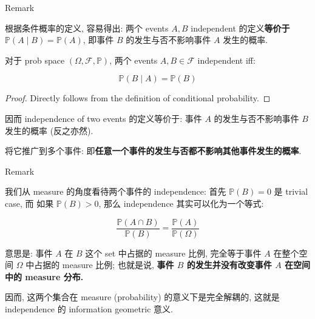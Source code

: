 \begin{qlremark}{Remark}

根据条件概率的定义, 容易得出: 两个 events \(\mathit{A},\mathit{B}\) independent 的定义\textbf{等价于 \(\mathbb{P}(\mathit{A} \mid \mathit{B}) = \mathbb{P}(\mathit{A})\)}, 即事件 \(\mathit{B}\) 的发生与否不影响事件 \(\mathit{A}\) 发生的概率.\\

\begin{proposition}{}

对于 prob space \((\Omega,\mathcal{F},\mathbb{P})\), 两个 events \(\mathit{A},\mathit{B} \in \mathcal{F}\) independent iff:

\[\mathbb{P}(\mathit{B} \mid \mathit{A}) = \mathbb{P}(\mathit{B})\]

\end{proposition}

\begin{proof}

Directly follows from the definition of conditional probability.

\end{proof}

因而 independence of two events 的定义等价于: 事件 \(\mathit{A}\) 的发生与否不影响事件 \(\mathit{B}\) 发生的概率 (反之亦然).

将它推广到多个事件: 即\textbf{任意一个事件的发生与否都不影响其他事件发生的概率}.

\end{qlremark}

\begin{qlremark}{Remark}

我们从 measure 的角度看待两个事件的 independence: 首先 \(\mathbb{P}(\mathit{B}) = 0\) 是 trivial case, 而 如果 \(\mathbb{P}(\mathit{B}) > 0\), 那么 independence 其实可以化为一个等式:

\[\frac{\mathbb{P}(\mathit{A} \cap \mathit{B})}{\mathbb{P}(\mathit{B})} = \frac{\mathbb{P}(\mathit{A})}{\mathbb{P}(\Omega)}\]

意思是: 事件 \(\mathit{A}\) 在 \(\mathit{B}\) 这个 set 中占据的 measure 比例, 完全等于事件 \(\mathit{A}\) 在整个空间 \(\Omega\) 中占据的 measure 比例; 也就是说, \textbf{事件 \(\mathit{B}\) 的发生并没有改变事件 \(\mathit{A}\) 在空间中的 measure 分布.}

因而, 这两个集合在 measure (probability) 的意义下是完全解耦的, 这就是 independence 的 information geometric 意义.

\end{qlremark}


